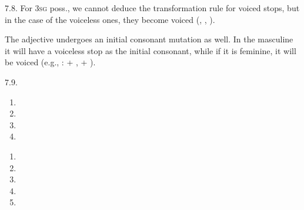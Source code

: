 \begin{refsection}
\begin{practiceproblemsolution}{7.8. \langnameWelsh}
For 3\textsc{sg} poss., we cannot deduce the transformation rule for voiced stops, but in the case of the voiceless ones, they become voiced (, , ).

The adjective undergoes an initial consonant mutation as well. In the masculine it will have a voiceless stop as the initial consonant, while if it is feminine, it will be voiced (e.g., :  + ,  + ).


\end{practiceproblemsolution}

\begin{practiceproblemsolution}{7.9. \langnameTadaksahak}

\begin{solutions}[label=Solution 7.9\alph*]
    \item
    \begin{enumerate}[start = 17]
        \item {}
        \item {}
        \item {}
        \item {}
    \end{enumerate}
    \item
    \begin{enumerate}[resume]

        \item {}
        \item {}
        \item {}
        \item {}
        \item {}
    \end{enumerate}
\end{solutions}


\end{practiceproblemsolution}
\end{refsection}
